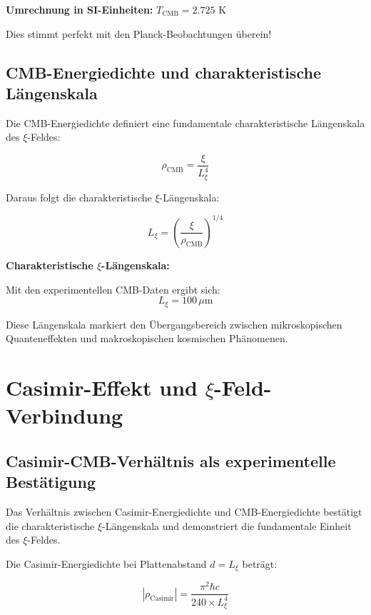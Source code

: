 \documentclass[12pt,a4paper]{article}
\newcommand{\xipar}{\xi}
\newcommand{\Lxi}{L_\xi}
\newcommand{\rhoCMB}{\rho_{\text{CMB}}}
\newcommand{\rhoCasimir}{\rho_{\text{Casimir}}}
\begin{document}
	\textbf{Umrechnung in SI-Einheiten:} $T_{\text{CMB}} = 2.725$ K
	
	Dies stimmt perfekt mit den Planck-Beobachtungen überein!
	
	\subsection{CMB-Energiedichte und charakteristische Längenskala}
	
	Die CMB-Energiedichte definiert eine fundamentale charakteristische Längenskala des $\xi$-Feldes:
	
	\begin{equation}
		\rhoCMB = \frac{\xipar}{\Lxi^4}
	\end{equation}
	
	Daraus folgt die charakteristische $\xi$-Längenskala:
	
	\begin{equation}
		\Lxi = \left(\frac{\xipar}{\rhoCMB}\right)^{1/4}
	\end{equation}
	
	\begin{keyresult}
		\textbf{Charakteristische $\xi$-Längenskala:}
		
		Mit den experimentellen CMB-Daten ergibt sich:
		\begin{equation}
			\Lxi = 100 \, \mu\text{m}
		\end{equation}
		
		Diese Längenskala markiert den Übergangsbereich zwischen mikroskopischen Quanteneffekten und makroskopischen kosmischen Phänomenen.
	\end{keyresult}
	
	\section{Casimir-Effekt und $\xi$-Feld-Verbindung}
	
	\subsection{Casimir-CMB-Verhältnis als experimentelle Bestätigung}
	
	Das Verhältnis zwischen Casimir-Energiedichte und CMB-Energiedichte bestätigt die charakteristische $\xi$-Längenskala und demonstriert die fundamentale Einheit des $\xi$-Feldes.
	
	Die Casimir-Energiedichte bei Plattenabstand $d = \Lxi$ beträgt:
	
	\begin{equation}
		|\rhoCasimir| = \frac{\pi^2 \hbar c}{240 \times \Lxi^4}
	\end{equation}
	
\end{document}
